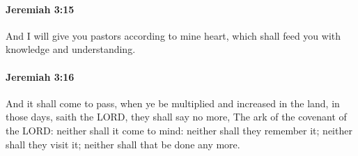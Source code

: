 		\paragraph{Jeremiah 3:15} %
			\label{JEREMIAH-3-15}

			And I will give you pastors according to mine heart, which shall feed you with knowledge and understanding.


		\paragraph{Jeremiah 3:16} %
			\label{JEREMIAH-3-16}

			And it shall come to pass, when ye be multiplied and increased in the land, in those days, saith the LORD, they shall say no more, The ark of the covenant of the LORD: neither shall it come to mind: neither shall they remember it; neither shall they visit it; neither shall that be done any more.

